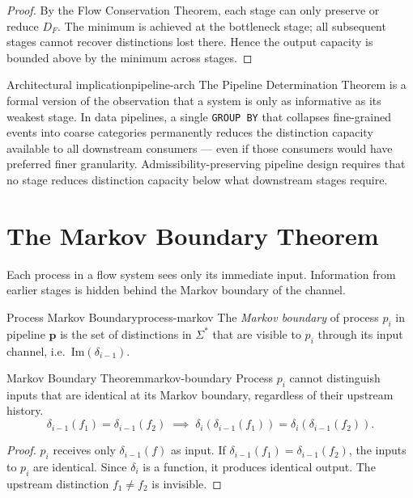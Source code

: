 \documentclass[12pt,twoside,openright]{book}
\newcommand{\csicon} {\marginpar{\tiny\color{DistBlue}\faCode}}
\begin{document}
\begin{proof}
  By the Flow Conservation Theorem, each stage can only
  preserve or reduce $D_F$. The minimum is achieved at
  the bottleneck stage; all subsequent stages cannot
  recover distinctions lost there. Hence the output
  capacity is bounded above by the minimum across stages.
\end{proof}

\begin{remark}{Architectural implication}{pipeline-arch}
  \csicon
  The Pipeline Determination Theorem is a formal version
  of the observation that a system is only as informative
  as its weakest stage. In data pipelines, a single
  \texttt{GROUP BY} that collapses fine-grained events
  into coarse categories permanently reduces the
  distinction capacity available to all downstream
  consumers — even if those consumers would have
  preferred finer granularity. Admissibility-preserving
  pipeline design requires that no stage reduces
  distinction capacity below what downstream stages
  require.
\end{remark}

\section{The Markov Boundary Theorem}

Each process in a flow system sees only its immediate
input. Information from earlier stages is hidden behind
the Markov boundary of the channel.

\begin{definition}{Process Markov Boundary}{process-markov}
  The \emph{Markov boundary} of process $p_i$ in
  pipeline $\mathbf{p}$ is the set of distinctions
  in $\Sigma^*$ that are visible to $p_i$ through its
  input channel, i.e.\ $\mathrm{Im}(\delta_{i-1})$.
\end{definition}

\begin{theorem}{Markov Boundary Theorem}{markov-boundary}
  Process $p_i$ cannot distinguish inputs that are
  identical at its Markov boundary, regardless of their
  upstream history.
  \[
    \delta_{i-1}(f_1) = \delta_{i-1}(f_2)
    \;\implies\;
    \delta_i(\delta_{i-1}(f_1)) = \delta_i(\delta_{i-1}(f_2)).
  \]
\end{theorem}

\begin{proof}
  $p_i$ receives only $\delta_{i-1}(f)$ as input.
  If $\delta_{i-1}(f_1) = \delta_{i-1}(f_2)$, the inputs
  to $p_i$ are identical. Since $\delta_i$ is a function,
  it produces identical output. The upstream distinction
  $f_1 \ne f_2$ is invisible.
\end{proof}
\end{document}
